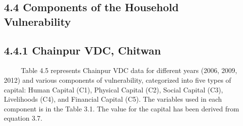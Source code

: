 \subsection*{4.4 Components of the Household Vulnerability}
\renewcommand{\thepage}{\arabic{page}}
\subsection*{4.4.1 Chainpur VDC, Chitwan}
\ \ \ \ \ Table 4.5 represents Chainpur VDC data for different years (2006, 2009, 2012) and various components of vulnerability, categorized into five types of capital: Human Capital (C1), Physical Capital (C2), Social Capital (C3), Livelihoods (C4), and Financial Capital (C5). The variables used in each component is in the Table 3.1. The value for the capital has been derived from equation 3.7.

